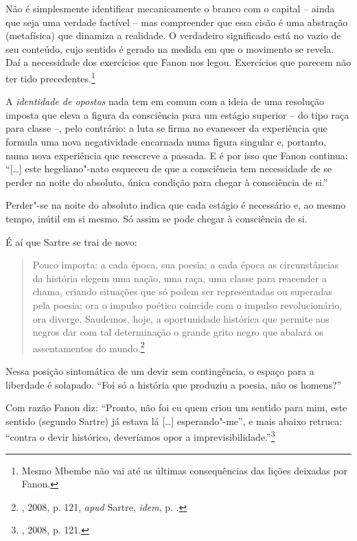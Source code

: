 Não é simplesmente identificar mecanicamente o branco com o capital --
ainda que seja uma verdade factível -- mas compreender que essa cisão é
uma abstração (metafísica) que dinamiza a realidade. O verdadeiro
significado está no vazio de seu conteúdo, cujo sentido é gerado na
medida em que o movimento se revela. Daí a necessidade dos exercícios
que Fanon nos legou. Exercícios que parecem não ter tido
precedentes.\footnote{Mesmo Mbembe não vai até as últimas consequências
  das lições deixadas por Fanon.}

A \emph{identidade de opostos} nada tem em comum com a ideia de uma
resolução imposta que eleva a figura da consciência para um estágio
superior -- do tipo raça para classe --, pelo contrário: a luta se firma
no evanescer da experiência que formula uma nova negatividade encarnada
numa figura singular e, portanto, numa nova experiência que reescreve a
passada. E é por isso que Fanon continua: ``{[}\ldots{}{]}
este hegeliano"-nato esqueceu de
que a consciência tem necessidade de se perder na noite do absoluto,
única condição para chegar à consciência de si.''

Perder"-se na noite do absoluto indica que cada
estágio é necessário e, ao mesmo
tempo, inútil em si mesmo. Só assim se pode chegar à consciência de si.

É aí que Sartre se trai de novo:

\begin{quote}
Pouco importa: a cada época, sua poesia; a cada época as circunstâncias
da história elegem uma nação, uma raça, uma classe para reacender a
chama, criando situações que só podem ser representadas ou superadas
pela poesia; ora o impulso poético coincide com o impulso
revolucionário, ora diverge. Saudemos, hoje, a oportunidade histórica
que permite aos negros dar com tal determinação o grande grito negro
que abalará os assentamentos do mundo.\footnote{, 2008, p. 121, \emph{apud}
  Sartre, \emph{idem}, p. .}
\end{quote}

Nessa posição sintomática de um devir sem contingência, o espaço para a
liberdade é solapado. ``Foi só a história que produziu a poesia, não os
homens?''

Com razão Fanon diz: ``Pronto, não foi eu quem criou um sentido para
mim, este sentido (segundo Sartre) já estava lá {[}\ldots{}{]}
esperando"-me'', e mais abaixo retruca: ``contra o devir histórico,
deveríamos opor a imprevisibilidade.''\footnote{, 2008, p. 121.}

